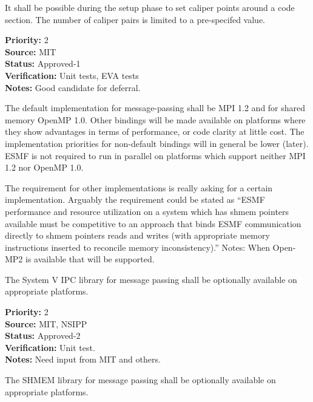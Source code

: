 
It shall be possible during the setup phase to set caliper points
around a code section.  The number of
caliper pairs is limited to a pre-specifed value.

\begin{reqlist}
{\bf Priority:} 2 \\
{\bf Source:}  MIT \\
{\bf Status:} Approved-1 \\
{\bf Verification:} Unit tests, EVA tests \\
{\bf Notes:} Good candidate for deferral.
\end{reqlist}



The default implementation for message-passing shall be MPI 1.2 and for
shared memory OpenMP 1.0.  Other bindings will be made available on
platforms where they show advantages in terms of performance, or code
clarity at little cost. The implementation priorities for non-default
bindings will in general be lower (later). ESMF is not required to run
in parallel on platforms which support neither MPI 1.2 nor OpenMP 1.0.

The requirement for other implementations is really asking for a certain
implementation. Arguably the requirement could be stated as ``ESMF
performance and resource utilization on a system which has shmem
pointers available must be competitive to an approach that binds ESMF
communication directly to shmem pointers reads and writes (with
appropriate memory instructions inserted to reconcile memory
inconsistency).''
Notes:  When Open-MP2 is available that will be supported.


The System V IPC library for message passing shall be optionally
available on appropriate platforms.

\begin{reqlist}
{\bf Priority:} 2 \\
{\bf Source:}  MIT, NSIPP \\
{\bf Status:} Approved-2 \\
{\bf Verification:} Unit test. \\
{\bf Notes:} Need input from MIT and others.
\end{reqlist}


The SHMEM library for message passing shall be optionally
available on appropriate platforms.

